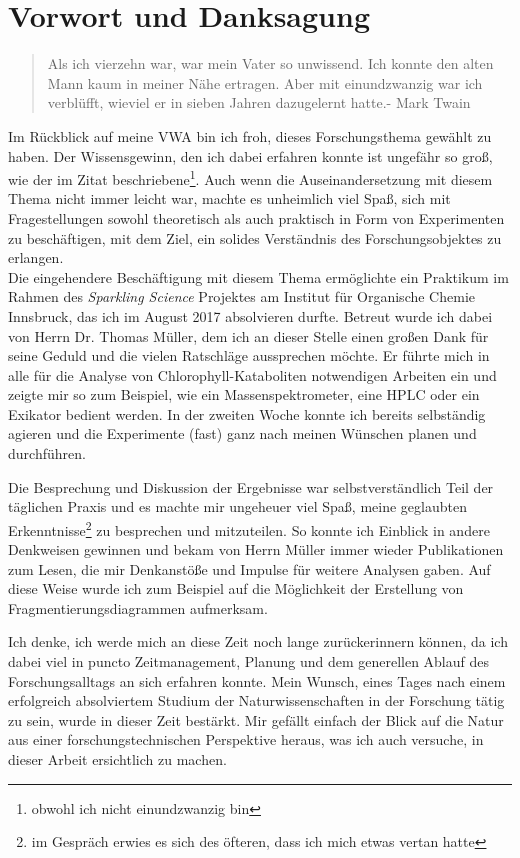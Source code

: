 \chapter*{Vorwort und Danksagung}
\label{cha:Vorwort}

\begin{quotation}
\glqq Als ich vierzehn war, war mein Vater so unwissend. Ich konnte den alten Mann kaum in meiner Nähe ertragen. Aber mit einundzwanzig war ich verblüfft, wieviel er in sieben Jahren dazugelernt hatte.\grqq - Mark Twain
\end{quotation}

Im Rückblick auf meine VWA bin ich froh, dieses Forschungsthema gewählt zu haben. Der Wissensgewinn, den ich dabei erfahren konnte ist ungefähr so groß, wie der im Zitat beschriebene\footnote{obwohl ich nicht einundzwanzig bin}. Auch wenn die Auseinandersetzung mit diesem Thema nicht immer leicht war, machte es unheimlich viel Spaß, sich mit Fragestellungen sowohl theoretisch als auch praktisch in Form von Experimenten zu beschäftigen, mit dem Ziel, ein solides Verständnis des Forschungsobjektes zu erlangen.\\

Die eingehendere Beschäftigung mit diesem Thema ermöglichte ein Praktikum im Rahmen des \textit{Sparkling Science} Projektes am Institut für Organische Chemie Innsbruck, das ich im August 2017 absolvieren durfte. Betreut wurde ich dabei von Herrn Dr. Thomas Müller, dem ich an dieser Stelle einen großen Dank für seine Geduld und die vielen Ratschläge aussprechen möchte. Er führte mich in alle für die Analyse von Chlorophyll-Kataboliten notwendigen Arbeiten ein und zeigte mir so zum Beispiel, wie ein Massenspektrometer, eine HPLC oder ein Exikator bedient werden. In der zweiten Woche konnte ich bereits selbständig agieren und die Experimente (fast) ganz nach meinen Wünschen planen und durchführen. 

Die Besprechung und Diskussion der Ergebnisse war selbstverständlich Teil der täglichen Praxis und es machte mir ungeheuer viel Spaß, meine geglaubten Erkenntnisse\footnote{im Gespräch erwies es sich des öfteren, dass ich mich etwas vertan hatte} zu besprechen und mitzuteilen. So konnte ich Einblick in andere Denkweisen gewinnen und bekam von Herrn Müller immer wieder Publikationen zum Lesen, die mir Denkanstöße und Impulse für weitere Analysen gaben. Auf diese Weise wurde ich zum Beispiel auf die Möglichkeit der Erstellung von Fragmentierungsdiagrammen aufmerksam. 

Ich denke, ich werde mich an diese Zeit noch lange zurückerinnern können, da ich dabei viel in puncto Zeitmanagement, Planung und dem generellen Ablauf des Forschungsalltags an sich erfahren konnte. Mein Wunsch, eines Tages nach einem erfolgreich absolviertem Studium der Naturwissenschaften in der Forschung tätig zu sein, wurde in dieser Zeit bestärkt. Mir gefällt einfach der Blick auf die Natur aus einer forschungstechnischen Perspektive heraus, was ich auch versuche, in dieser Arbeit ersichtlich zu machen.\\

